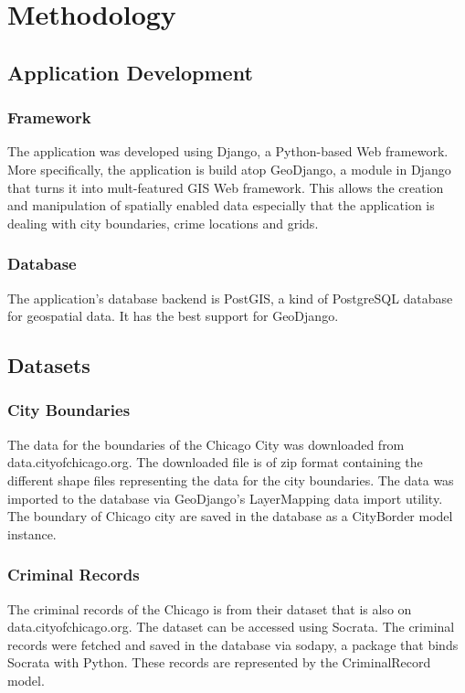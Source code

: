 
\chapter{Methodology}  %


\section{Application Development}
    \subsection{Framework}
        The application was developed using Django, a Python-based Web framework. More specifically, the application is build atop GeoDjango, a module in Django that turns it into mult-featured GIS Web framework. This allows the creation and manipulation of spatially enabled data especially that the application is dealing with city boundaries, crime locations and grids.

    \subsection{Database}
        The application's database backend is PostGIS, a kind of PostgreSQL database for geospatial data. It has the best support for GeoDjango.

\section{Datasets}
    \subsection{City Boundaries}
        The data for the boundaries of the Chicago City was downloaded from data.cityofchicago.org. The downloaded file is of zip format containing the different shape files representing the data for the city boundaries. The data was imported to the database via GeoDjango's LayerMapping data import utility. The boundary of Chicago city are saved in the database as a CityBorder model instance.
    \subsection{Criminal Records}
        The criminal records of the Chicago is from their dataset that is also on data.cityofchicago.org. The dataset can be accessed using Socrata. The criminal records were fetched and saved in the database via sodapy, a package that binds Socrata with Python. These records are represented by the CriminalRecord model.

